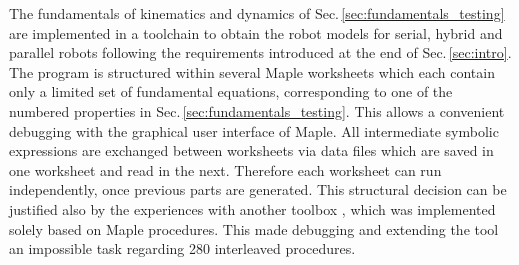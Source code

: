 \documentclass[runningheads]{llncs}
\begin{document}

The fundamentals of kinematics and dynamics of Sec.\,\ref{sec:fundamentals_testing} are implemented in a toolchain to obtain the robot models for serial, hybrid and parallel robots following the requirements introduced at the end of Sec.\,\ref{sec:intro}.
The program is structured within several Maple worksheets which each contain only a limited set of fundamental equations, corresponding to one of the numbered properties in Sec.\,\ref{sec:fundamentals_testing}.
This allows a convenient debugging with the graphical user interface of Maple.
All intermediate symbolic expressions are exchanged between worksheets via data files which are saved in one worksheet and read in the next. 
Therefore each worksheet can run independently, once previous parts are generated.
This structural decision can be justified also by the experiences with another toolbox \cite{DoThanhKotHeiOrt2009b}, which was implemented solely based on Maple procedures.
This made debugging and extending the tool an impossible task regarding 280 interleaved procedures.%
\end{document}
